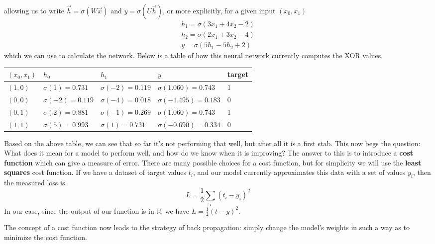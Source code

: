 \documentclass[12pt,letterpaper]{book}
\theoremstyle{definition}
\begin{document}
  allowing us to write $\vec{h} = \sigma(W\vec{x})$ and $y = \sigma(U\vec{h})$, 
  or more explicitly, for a given input $(x_0, x_1)$
  \begin{align}
    h_1 = \sigma(3x_1 + 4x_2 -2)\\
    h_2 = \sigma(2x_1 + 3x_2 -4)\\
    y = \sigma(5h_1 - 5h_2 + 2)
  \end{align}
  which we can use to calculate the network.
  Below is a table of how this neural network currently computes the XOR values.
  \begin{center}
    \begin{tabular}{ |p{1.5cm}||p{3cm}|p{3cm}|p{3.5cm}|p{1.5cm}| }
      \hline
      $(x_0, x_1)$ & $h_0$ & $h_1$ & $y$ & target\\
      \hline
      $(1, 0)$ & $\sigma(1) = 0.731$ & $\sigma(-2) = 0.119$ & $\sigma(1.060) = 0.743$ & 1 \\
      \hline
      $(0, 0)$ & $\sigma(-2) = 0.119$ & $\sigma(-4) = 0.018$ & $\sigma(-1.495) = 0.183$  & 0\\
      \hline
      $(0, 1)$ & $\sigma(2) = 0.881$ & $\sigma(-1) = 0.269$ & $\sigma(1.060) = 0.743$ & 1 \\
      \hline
      $(1, 1)$ & $\sigma(5) = 0.993$ & $\sigma(1) = 0.731$ & $\sigma(-0.690) = 0.334$ & 0\\
      \hline
     \end{tabular}
     
  \end{center}
  Based on the above table, we can see that so far it's not performing that well, but after 
  all it is a first stab. This now begs the question: What does it 
  mean for a model to perform well, and how do we know when it is improving? The answer
  to this is to introduce a \textbf{cost function} which can give a measure of error. There are 
  many possible choices for a cost function, but for simplicity we will use the \textbf{least squares}
  cost function. If we have a dataset of target values $t_i$, and our model currently 
  approximates this data with a set of values $y_i$, then the measured loss is 
  \[
      L = \frac{1}{2}\sum_{i}(t_i - y_i)^2
  \] 
  In our case, since the output of our function is in $\mathbb{R}$, we have 
  $L = \frac{1}{2}(t - y)^2$. 

  The concept of a cost function now leads to the strategy of back propagation: simply change the 
  model's weights in such a way as to minimize the cost function.
\end{document}
